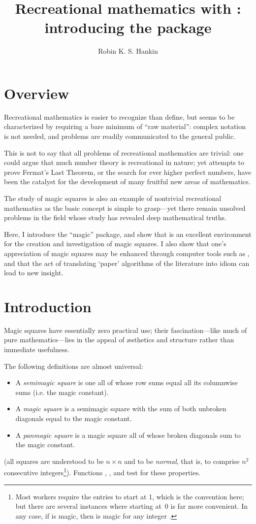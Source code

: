 \documentclass[nojss]{jss}
\author{Robin K. S. Hankin}
\title{Recreational mathematics with \proglang{R}:
introducing the \pkg{magic} package}
\begin{document}
\section{Overview}
Recreational mathematics is easier to recognize than define, but seems
to be characterized by requiring a bare minimum of ``raw material'':
complex notation is not needed, and problems are readily communicated
to the general public.  

This is not to say that all problems of recreational mathematics are
trivial: one could argue that much number theory is recreational in
nature; yet attempts to prove Fermat's Last Theorem, or the search for
ever higher perfect numbers, have been the catalyst for the
development of many fruitful new areas of mathematics.  

The study of magic squares is also an example of nontrivial
recreational mathematics as the basic concept is simple to grasp---yet
there remain unsolved problems in the field whose study has revealed
deep mathematical truths.

Here, I introduce the ``magic'' package, and show that  is an
excellent environment for the creation and investigation of magic
squares.  I also show that one's appreciation of magic squares may be
enhanced through computer tools such as , and that the act of
translating `paper' algorithms of the literature into  idiom can
lead to new insight.


\section{Introduction}
Magic squares have essentially zero practical use; their
fascination---like much of pure mathematics---lies in the appeal of
\ae sthetics and structure rather than immediate usefulness.

The following definitions are almost universal:
\begin{itemize}
\item A {\em semimagic square} is one all of whose row sums equal all its
columnwise sums (i.e. the magic constant).

\item A {\em magic square} is a semimagic square with the sum of both
unbroken diagonals equal to the magic constant.

\item A {\em panmagic square} is a magic square all of whose broken
diagonals sum to the magic constant.

\end{itemize}
(all squares are understood to be $n\times n$ and to be {\em
normal\/}, that is, to comprise $n^2$ consecutive
integers\footnote{Most workers require the entries to start at 1,
which is the convention here; but there are several instances where
starting at~0 is far more convenient.  In any case, if  is
magic, then  is magic for any integer .}).  Functions
, , and 
test for these properties.
\end{document}
